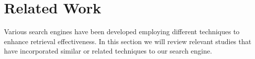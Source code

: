 \section{Related Work}
\label{sec:related}

Various search engines have been developed employing different techniques to enhance retrieval effectiveness.
In this section we will review relevant studies that have incorporated similar or related techniques to our search
engine.

